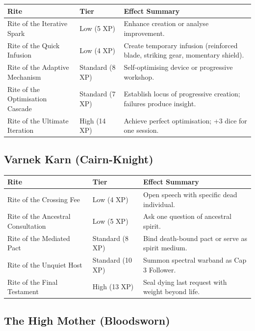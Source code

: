 \begin{longtable}{p{} p{} p{}}
\hline
\textbf{Rite} & \textbf{Tier} & \textbf{Effect Summary} \\
\hline
Rite of the Iterative Spark & Low (5 XP) & Enhance creation or analyse improvement. \\
Rite of the Quick Infusion & Low (4 XP) & Create temporary infusion (reinforced blade, striking gear, momentary shield). \\
Rite of the Adaptive Mechanism & Standard (8 XP) & Self-optimising device or progressive workshop. \\
Rite of the Optimisation Cascade & Standard (7 XP) & Establish locus of progressive creation; failures produce insight. \\
Rite of the Ultimate Iteration & High (14 XP) & Achieve perfect optimisation; +3 dice for one session. \\
\hline
\end{longtable}

\subsection{Varnek Karn (Cairn-Knight)}

\begin{longtable}{p{} p{} p{}}
\hline
\textbf{Rite} & \textbf{Tier} & \textbf{Effect Summary} \\
\hline
Rite of the Crossing Fee & Low (4 XP) & Open speech with specific dead individual. \\
Rite of the Ancestral Consultation & Low (5 XP) & Ask one question of ancestral spirit. \\
Rite of the Mediated Pact & Standard (8 XP) & Bind death-bound pact or serve as spirit medium. \\
Rite of the Unquiet Host & Standard (10 XP) & Summon spectral warband as Cap 3 Follower. \\
Rite of the Final Testament & High (13 XP) & Seal dying last request with weight beyond life. \\
\hline
\end{longtable}

\subsection{The High Mother (Bloodsworn)}

